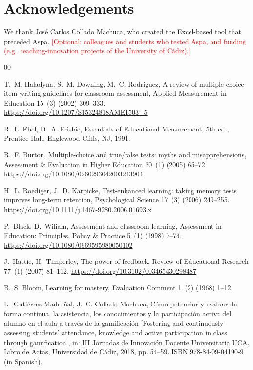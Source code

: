 \documentclass[preprint,12pt, a4paper]{elsarticle}
\newcommand{\todo}[1]{\textcolor{red}{[#1]}}
\begin{document}
\section*{Acknowledgements}
\label{sec:acknowledgements}

We thank José Carlos Collado Machuca, who created the Excel-based tool that preceded Aspa. \todo{Optional: colleagues and students who tested Aspa, and funding (e.g.\ teaching-innovation projects of the University of Cádiz).}

\begin{thebibliography}{00}
\small

 T.~M. Haladyna, S.~M. Downing, M.~C. Rodriguez, A review of multiple-choice item-writing guidelines for classroom assessment, Applied Measurement in Education 15~(3) (2002) 309--333. \url{https://doi.org/10.1207/S15324818AME1503_5}

 R.~L. Ebel, D.~A. Frisbie, Essentials of Educational Measurement, 5th ed., Prentice Hall, Englewood Cliffs, NJ, 1991.

 R.~F. Burton, Multiple-choice and true/false tests: myths and misapprehensions, Assessment \& Evaluation in Higher Education 30~(1) (2005) 65--72. \url{https://doi.org/10.1080/0260293042003243904}

 H.~L. Roediger, J.~D. Karpicke, Test-enhanced learning: taking memory tests improves long-term retention, Psychological Science 17~(3) (2006) 249--255. \url{https://doi.org/10.1111/j.1467-9280.2006.01693.x}

 P.~Black, D.~Wiliam, Assessment and classroom learning, Assessment in Education: Principles, Policy \& Practice 5~(1) (1998) 7--74. \url{https://doi.org/10.1080/0969595980050102}

 J.~Hattie, H.~Timperley, The power of feedback, Review of Educational Research 77~(1) (2007) 81--112. \url{https://doi.org/10.3102/003465430298487}

 B.~S. Bloom, Learning for mastery, Evaluation Comment 1~(2) (1968) 1--12.

 L.~Gutiérrez-Madroñal, J.~C. Collado Machuca, Cómo potenciar y evaluar de forma continua, la asistencia, los conocimientos y la participación activa del alumno en el aula a través de la gamificación [Fostering and continuously assessing students' attendance, knowledge and active participation in class through gamification], in: III Jornadas de Innovación Docente Universitaria UCA. Libro de Actas, Universidad de Cádiz, 2018, pp. 54--59. ISBN 978-84-09-04190-9 (in Spanish).


\end{thebibliography}
\end{document}
